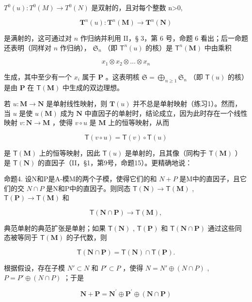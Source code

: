 \(T^{0}(u):T^{0}(M)\rightarrow T^{0}(N)\) 是双射的，且对每个整数 n\textgreater0,

\[
\mathbf {T} ^ {n} (u): \mathbf {T} ^ {n} (\mathbf {M}) \rightarrow \mathbf {T} ^ {n} (\mathbf {N})
\]

是满射的，这可通过对 \(n\) 作归纳并利用 II，§ 3，第 6 号，命题 6 看出；后一命题还表明（同样对 \(n\) 作归纳）， \(\mathfrak{S}_n\) （即 \(\mathsf{T}^n(u)\) 的核）是 \(\mathsf{T}^n(\mathbf{M})\) 中由乘积

\[
x _ {1} \otimes x _ {2} \otimes \dots \otimes x _ {n}
\]

生成，其中至少有一个 \(x_{i}\) 属于 \(\mathbf{P}\) 。这表明核 \(\mathfrak{S} = \bigoplus_{n\geqslant 1}\mathfrak{S}_n\) （即 \(\mathsf{T}(u)\) 的核）是由 \(\mathbf{P}\) 在 \(\mathsf{T}(\mathbf{M})\) 中生成的双边理想。

若 \(u: \mathbf{M} \to \mathbf{N}\) 是单射线性映射，则 \(\mathbf{T}(u)\) 并不总是单射映射（练习1）。然而，当 \(u\) 是使 \(u(\mathbf{M})\) 成为 \(\mathbf{N}\) 中直因子的单射时，结论成立，因为此时存在一个线性映射 \(v: \mathbf{N} \to \mathbf{M}\) ，使得 \(v \circ u\) 是 \(\mathbf{M}\) 上的恒等映射，从而

\[
\mathsf {T} (v \circ u) = \mathsf {T} (v) \circ \mathsf {T} (u)
\]

是 \(\mathsf{T}(\mathbf{M})\) 上的恒等映射，因此 \(\mathsf{T}(u)\) 是单射的，且其像（同构于 \(\mathsf{T}(\mathbf{M})\) ）是 \(\mathsf{T}(\mathbf{N})\) 的直因子（II，§1，第9号，命题15）。更精确地说：

命题4. 设N和P是A-模M的两个子模，使得它们的和 \(N + P\) 是M中的直因子，且它们的交 \(N \cap P\) 是N和P中的直因子。则同态 \(\mathsf{T}(\mathbf{N}) \to \mathsf{T}(\mathbf{M})\) , \(\mathsf{T}(\mathbf{P}) \to \mathsf{T}(\mathbf{M})\) 和

\[
\mathsf {T} (\mathbf {N} \cap \mathbf {P}) \rightarrow \mathsf {T} (\mathbf {M}),
\]

典范单射的典范扩张是单射；如果 \(\mathsf{T}(\mathbf{N})\) , \(\mathsf{T}(\mathbf{P})\) 和 \(\mathsf{T}(\mathbf{N} \cap \mathbf{P})\) 通过这些同态被等同于 \(\mathsf{T}(\mathbf{M})\) 的子代数，则

\[
\mathsf {T} (\mathbf {N} \cap \mathbf {P}) = \mathsf {T} (\mathbf {N}) \cap \mathsf {T} (\mathbf {P}).\tag{5}
\]

根据假设，存在子模 \(N' \subset N\) 和 \(P' \subset P\) ，使得 \(N = N' \oplus (N \cap P)\) , \(P = P' \oplus (N \cap P)\) ；于是

\[
\mathbf {N} + \mathbf {P} = \mathbf {N} ^ {\prime} \oplus \mathbf {P} ^ {\prime} \oplus (\mathbf {N} \cap \mathbf {P})
\]

